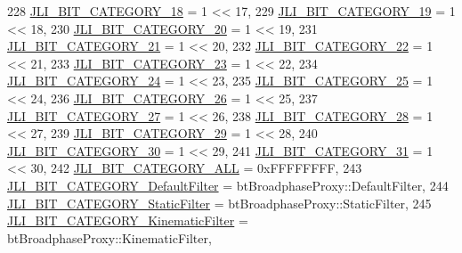 \begin{DoxyCode}
228     \mbox{\hyperlink{namespacenjli_af7b302a2b48bb644f85c88080925c974a28469478d5918d029fcbe01a5a2990b5}{JLI\_BIT\_CATEGORY\_18}} = 1 << 17,
229     \mbox{\hyperlink{namespacenjli_af7b302a2b48bb644f85c88080925c974a82dafd9a1de879d0394866293a10974f}{JLI\_BIT\_CATEGORY\_19}} = 1 << 18,
230     \mbox{\hyperlink{namespacenjli_af7b302a2b48bb644f85c88080925c974aa637214a69fb2cc01445b70b7c694a3c}{JLI\_BIT\_CATEGORY\_20}} = 1 << 19,
231     \mbox{\hyperlink{namespacenjli_af7b302a2b48bb644f85c88080925c974ac2f8ef0a3cefe88e4309896138685f87}{JLI\_BIT\_CATEGORY\_21}} = 1 << 20,
232     \mbox{\hyperlink{namespacenjli_af7b302a2b48bb644f85c88080925c974a56adffc605eaa40acfa770dcb64ffff5}{JLI\_BIT\_CATEGORY\_22}} = 1 << 21,
233     \mbox{\hyperlink{namespacenjli_af7b302a2b48bb644f85c88080925c974a27ca11b4078a686a3f2ac0c784a974b6}{JLI\_BIT\_CATEGORY\_23}} = 1 << 22,
234     \mbox{\hyperlink{namespacenjli_af7b302a2b48bb644f85c88080925c974a16d8757a3ba4644d33982a1dd068a754}{JLI\_BIT\_CATEGORY\_24}} = 1 << 23,
235     \mbox{\hyperlink{namespacenjli_af7b302a2b48bb644f85c88080925c974aa2575f4ef85bdb59a07170493011dbcd}{JLI\_BIT\_CATEGORY\_25}} = 1 << 24,
236     \mbox{\hyperlink{namespacenjli_af7b302a2b48bb644f85c88080925c974acbb07dc454f52be708ece7bdf448ae81}{JLI\_BIT\_CATEGORY\_26}} = 1 << 25,
237     \mbox{\hyperlink{namespacenjli_af7b302a2b48bb644f85c88080925c974aa1b71b6679656132b47f5e488010cec9}{JLI\_BIT\_CATEGORY\_27}} = 1 << 26,
238     \mbox{\hyperlink{namespacenjli_af7b302a2b48bb644f85c88080925c974a8fb1200221f4a16560a198778eb0de24}{JLI\_BIT\_CATEGORY\_28}} = 1 << 27,
239     \mbox{\hyperlink{namespacenjli_af7b302a2b48bb644f85c88080925c974a9220767239da4e6f3f280c42fb5b011e}{JLI\_BIT\_CATEGORY\_29}} = 1 << 28,
240     \mbox{\hyperlink{namespacenjli_af7b302a2b48bb644f85c88080925c974a9f28f3fe3e89e50f1eaebe49c8365209}{JLI\_BIT\_CATEGORY\_30}} = 1 << 29,
241     \mbox{\hyperlink{namespacenjli_af7b302a2b48bb644f85c88080925c974aff51240e9dc87aa802eaaad8ea14f2b4}{JLI\_BIT\_CATEGORY\_31}} = 1 << 30,
242     \mbox{\hyperlink{namespacenjli_af7b302a2b48bb644f85c88080925c974a5346e1c0c35ccc30a90bc2d15c531591}{JLI\_BIT\_CATEGORY\_ALL}} = 0xFFFFFFFF,
243     \mbox{\hyperlink{namespacenjli_af7b302a2b48bb644f85c88080925c974a53b33337014e199f56e752574f36981e}{JLI\_BIT\_CATEGORY\_DefaultFilter}} = btBroadphaseProxy::DefaultFilter,
244     \mbox{\hyperlink{namespacenjli_af7b302a2b48bb644f85c88080925c974a5fc6148cb03f12dc376273ffa516163d}{JLI\_BIT\_CATEGORY\_StaticFilter}} = btBroadphaseProxy::StaticFilter,
245     \mbox{\hyperlink{namespacenjli_af7b302a2b48bb644f85c88080925c974abe2b526b04665757528464a85a0484ff}{JLI\_BIT\_CATEGORY\_KinematicFilter}} = btBroadphaseProxy::KinematicFilter,

\end{DoxyCode}
